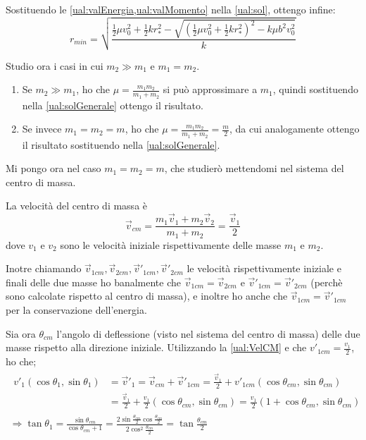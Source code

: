 \documentclass[../main.tex]{subfiles}
\begin{document}
Sostituendo le \cref{ual:valEnergia,ual:valMomento} nella \cref{ual:sol}, ottengo infine:
\begin{equation} \label{ual:solGenerale}
	r_{min}=\sqrt{\frac{\frac12\mu v_0^2+\frac12 kr_*^2-\sqrt{(\frac12\mu v_0^2+\frac12 kr_*^2)^2-k\mu b^2v_0^2}}{k}}
\end{equation}

Studio ora i casi in cui $m_2\gg m_1$ e $m_1=m_2$.
\begin{enumerate}
	\item Se $m_2\gg m_1$, ho che $\mu=\frac{m_1m_2}{m_1+m_2}$ si può approssimare a $m_1$, quindi sostituendo nella \cref{ual:solGenerale} ottengo il risultato. 
	\item Se invece $m_1=m_2=m$, ho che $\mu=\frac{m_1m_2}{m_1+m_2}=\frac m2$, da cui analogamente ottengo il risultato sostituendo nella \cref{ual:solGenerale}.
\end{enumerate}

Mi pongo ora nel caso $m_1=m_2=m$, che studierò mettendomi nel sistema del centro di massa.

La velocità del centro di massa è
\begin{equation}\label{ual:VelCM}
	\vec{v}_{cm}=\frac{m_1\vec v_1+m_2 \vec v_2}{m_1+m_2}=\frac{\vec v_1}{2}
\end{equation}
dove $v_1$ e $v_2$ sono le velocità iniziale rispettivamente delle masse $m_1$ e $m_2$.

Inotre chiamando $\vec v_{1cm},\vec v_{2cm},\vec v'_{1cm},\vec v'_{2cm}$ le velocità rispettivamente iniziale e finali delle due masse ho banalmente che $\vec v_{1cm} = \vec v_{2cm}$ e $\vec v'_{1cm}=\vec v'_{2cm}$ (perchè sono calcolate rispetto al centro di massa), e inoltre ho anche che $\vec v_{1cm}=\vec v'_{1cm}$ per la conservazione dell'energia.

Sia ora $\theta_{cm}$ l'angolo di deflessione (visto nel sistema del centro di massa) delle due masse rispetto alla direzione iniziale. Utilizzando la \cref{ual:VelCM} e che $v'_{1cm}=\frac{v_1}{2}$, ho che;
\begin{gather*}
\begin{split}
	v'_1(\cos\theta_1,\sin\theta_1)& =\vec v'_1 =\vec v_{cm}+\vec v'_{1cm}=\frac{\vec v_1}{2}+v'_{1cm}(\cos\theta_{cm},\sin\theta_{cm})\\
	&=\frac{\vec v_1}{2}+\frac{v_1}{2}(\cos\theta_{cm},\sin\theta_{cm})=\frac{v_1}2(1+\cos\theta_{cm},\sin\theta_{cm})
\end{split}\\
\Longrightarrow \tan \theta_1=\frac{\sin\theta_{cm}}{\cos\theta_{cm}+1}=\frac{2\sin\frac{\theta_{cm}}2 \cos\frac{\theta_{cm}}2}{2\cos^2\frac{\theta_{cm}}2}=\tan \frac{\theta_{cm}}2
\end{gather*}
\end{document}
